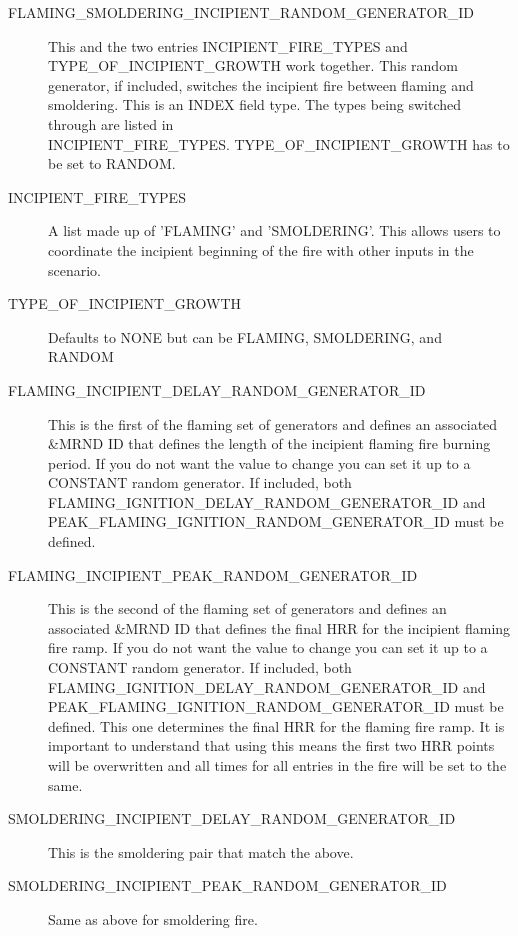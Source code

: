\documentclass[12pt,twoside]{book}
\begin{document}
 \begin{description}
  \item[FLAMING\_SMOLDERING\_INCIPIENT\_RANDOM\_GENERATOR\_ID] This and the two entries {\ct INCIPIENT\_FIRE\_TYPES} and {\ct TYPE\_OF\_INCIPIENT\_GROWTH} work together. This random generator, if included, switches the incipient fire between flaming and smoldering. This is an {\ct INDEX} field type. The types being switched through are listed in \\
   { \ct INCIPIENT\_FIRE\_TYPES}. {\ct TYPE\_OF\_INCIPIENT\_GROWTH} has to be set to {\ct RANDOM}.
  \item[INCIPIENT\_FIRE\_TYPES] A list made up of 'FLAMING' and 'SMOLDERING'. This allows users to coordinate the incipient beginning of the fire with other inputs in the scenario.
  \item[TYPE\_OF\_INCIPIENT\_GROWTH] Defaults to {\ct NONE} but can be {\ct FLAMING}, {\ct SMOLDERING}, and {\ct RANDOM}
  \item[FLAMING\_INCIPIENT\_DELAY\_RANDOM\_GENERATOR\_ID] This is the first of the flaming set of generators and defines an associated {\ct \&MRND} ID that defines the length of the incipient flaming fire burning period. If you do not want the value to change you can set it up to a {\ct CONSTANT} random generator. If included, both \\
      {\ct FLAMING\_IGNITION\_DELAY\_RANDOM\_GENERATOR\_ID} and \\
      {\ct PEAK\_FLAMING\_IGNITION\_RANDOM\_GENERATOR\_ID} must be defined.
  \item[FLAMING\_INCIPIENT\_PEAK\_RANDOM\_GENERATOR\_ID] This is the second of the flaming set of generators and defines an associated {\ct \&MRND} ID that defines the final HRR for the incipient flaming fire ramp. If you do not want the value to change you can set it up to a {\ct CONSTANT} random generator. If included, both \\
      {\ct FLAMING\_IGNITION\_DELAY\_RANDOM\_GENERATOR\_ID} and \\
      {\ct PEAK\_FLAMING\_IGNITION\_RANDOM\_GENERATOR\_ID} must be defined. This one determines the final HRR for the flaming fire ramp. It is important to understand that using this means the first two HRR points will be overwritten and all times for all entries in the fire will be set to the same.
  \item[SMOLDERING\_INCIPIENT\_DELAY\_RANDOM\_GENERATOR\_ID] This is the smoldering pair that match the above.
  \item[SMOLDERING\_INCIPIENT\_PEAK\_RANDOM\_GENERATOR\_ID] Same as above for smoldering fire.

\end{description}
\end{document}
